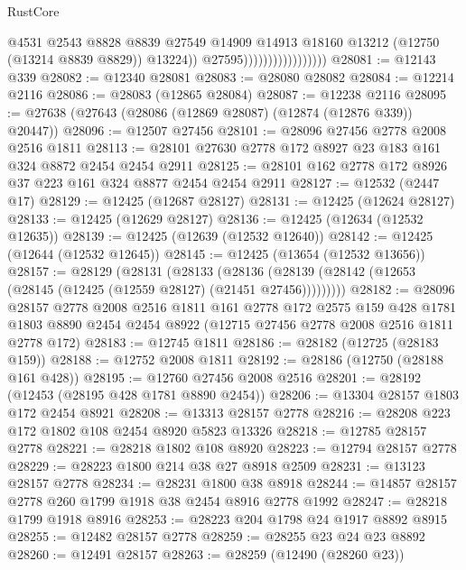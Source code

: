 \begin{lexlean}{RustCore}
\begin{coremodule}
                                          @4531
                                          @2543
                                          @8828
                                          @8839
                                          @27549
                                          @14909
                                          @14913
                                          @18160
                                          @13212
                                          (@12750 (@13214 @8839 @8829))
                                          @13224))
                                      @27595)))))))))))))))))
@28081 := @12143 @339
@28082 := @12340 @28081
@28083 := @28080 @28082
@28084 := @12214 @2116
@28086 := @28083 (@12865 @28084)
@28087 := @12238 @2116
@28095 := @27638 (@27643 (@28086 (@12869 @28087) (@12874 (@12876 @339)) @20447))
@28096 := @12507 @27456
@28101 := @28096 @27456 @2778 @2008 @2516 @1811
@28113 := @28101 @27630 @2778 @172 @8927 @23 @183 @161 @324 @8872 @2454 @2454 @2911
@28125 := @28101 @162 @2778 @172 @8926 @37 @223 @161 @324 @8877 @2454 @2454 @2911
@28127 := @12532 (@2447 @17)
@28129 := @12425 (@12687 @28127)
@28131 := @12425 (@12624 @28127)
@28133 := @12425 (@12629 @28127)
@28136 := @12425 (@12634 (@12532 @12635))
@28139 := @12425 (@12639 (@12532 @12640))
@28142 := @12425 (@12644 (@12532 @12645))
@28145 := @12425 (@13654 (@12532 @13656))
@28157 := @28129
    (@28131
      (@28133
        (@28136 (@28139 (@28142 (@12653 (@28145 (@12425 (@12559 @28127) (@21451 @27456)))))))))
@28182 := @28096
    @28157
    @2778
    @2008
    @2516
    @1811
    @161
    @2778
    @172
    @2575
    @159
    @428
    @1781
    @1803
    @8890
    @2454
    @2454
    @8922
    (@12715 @27456 @2778 @2008 @2516 @1811 @2778 @172)
@28183 := @12745 @1811
@28186 := @28182 (@12725 (@28183 @159))
@28188 := @12752 @2008 @1811
@28192 := @28186 (@12750 (@28188 @161 @428))
@28195 := @12760 @27456 @2008 @2516
@28201 := @28192 (@12453 (@28195 @428 @1781 @8890 @2454))
@28206 := @13304 @28157 @1803 @172 @2454 @8921
@28208 := @13313 @28157 @2778
@28216 := @28208 @223 @172 @1802 @108 @2454 @8920 @5823 @13326
@28218 := @12785 @28157 @2778
@28221 := @28218 @1802 @108 @8920
@28223 := @12794 @28157 @2778
@28229 := @28223 @1800 @214 @38 @27 @8918 @2509
@28231 := @13123 @28157 @2778
@28234 := @28231 @1800 @38 @8918
@28244 := @14857 @28157 @2778 @260 @1799 @1918 @38 @2454 @8916 @2778 @1992
@28247 := @28218 @1799 @1918 @8916
@28253 := @28223 @204 @1798 @24 @1917 @8892 @8915
@28255 := @12482 @28157 @2778
@28259 := @28255 @23 @24 @23 @8892
@28260 := @12491 @28157
@28263 := @28259 (@12490 (@28260 @23))

\end{coremodule}
\end{lexlean}
